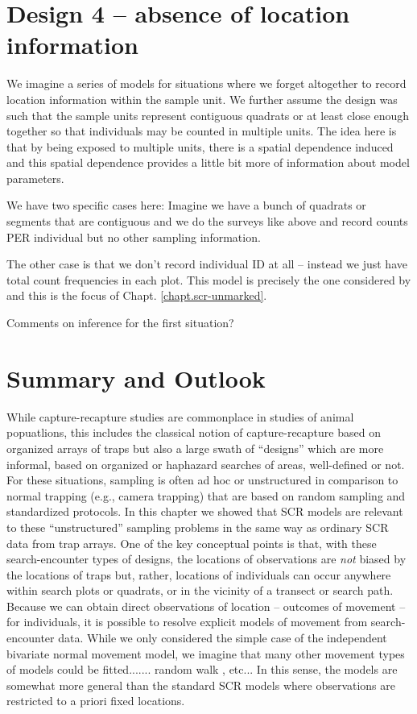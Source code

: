 \section{Design 4 -- absence of location information}

We imagine a series of models for situations where we forget
altogether to record location information within the sample unit. We
further assume the design was such that the sample units represent
contiguous quadrats or at least close enough together so that
individuals may be counted in multiple units. The idea here is that by
being exposed to multiple units, there is a spatial dependence induced
and this spatial dependence provides a little bit more of information
about model parameters. 

We have two specific cases here:
Imagine we have a bunch of quadrats or segments that are contiguous
and we do the surveys like above and record counts PER individual  but
no other sampling information. 

The other case is that we don't record individual ID at all -- instead
we just have total count frequencies in each plot. 
This model is precisely the one considered by
\citep{chandler_royle:2012} and this is the focus of Chapt. \ref{chapt.scr-unmarked}.

Comments on inference for the first situation?



\section{Summary and Outlook}

While capture-recapture studies are commonplace in studies of animal
popuatlions,
this includes
the classical notion of capture-recapture based on organized arrays of
traps  but also a large swath of ``designs'' which are more informal,
based on organized or haphazard searches of areas, well-defined or
not. For these situations, sampling is often ad hoc or unstructured in
comparison to normal trapping (e.g., camera trapping) that are based on random
sampling and standardized protocols. 
 In this chapter we showed that SCR models are relevant to these
``unstructured'' sampling problems in the same way as ordinary SCR
data from trap arrays. One of the key conceptual points is that, with
these search-encounter types of designs, the locations of observations
are {\it not} biased by the locations of traps but, rather, locations
of individuals can occur anywhere within search plots or quadrats, or
in the vicinity of a transect or search path. 
Because we can obtain direct observations of location -- outcomes of
movement -- for individuals, it is possible to resolve explicit models
of movement from search-encounter data.
While we only considered the simple case of the independent bivariate
normal movement model, we imagine that many other movement types of
models could be fitted....... random walk , etc...
In this sense, the models are somewhat more general than the standard
SCR models where observations are restricted to a priori fixed
locations.



